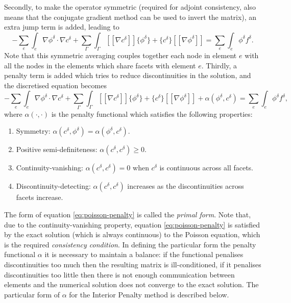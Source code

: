 Secondly, to make the operator symmetric (required for adjoint
consistency, also means that the conjugate gradient method can be used
to invert the matrix), an extra jump term is added, leading to
\begin{equation}
\label{eq:poisson-parts-facets-average-symmetric}
-\sum_e\int_e\nabla \phi^\delta\cdot\nabla c^\delta +
\sum_\Gamma\int_{\Gamma} [[\nabla c^\delta]]\{\phi^\delta\} +
\{c^\delta\}
[[\nabla\phi^\delta]] = \sum_e\int_e \phi^\delta f^{\delta}.
\end{equation}
Note that this symmetric averaging couples together each node in
element $e$ with all the nodes in the elements which share facets with
element $e$. Thirdly, a penalty term is added which tries to reduce
discontinuities in the solution, and the discretised equation becomes
\begin{equation}
\label{eq:poisson-penalty}
-\sum_e\int_e\nabla \phi^\delta\cdot\nabla c^\delta +
\sum_\Gamma\int_{\Gamma} [[\nabla c^\delta]]\{\phi^\delta\} +
\{c^\delta\}
[[\nabla\phi^\delta]] + \alpha(\phi^\delta,c^\delta)
= \sum_e\int_e \phi^\delta f^{\delta},
\end{equation}
where $\alpha(\cdot,\cdot)$ is the penalty functional which satisfies
the following properties:
\begin{enumerate}
\item Symmetry:
  $\alpha(c^\delta,\phi^\delta)=\alpha(\phi^\delta,c^\delta)$.
\item Positive semi-definiteness: $\alpha(c^\delta,c^\delta)\geq 0$.
\item Continuity-vanishing: $\alpha(c^\delta,c^\delta)=0$ when $c^\delta$ is continuous
 across all facets.
\item Discontinuity-detecting: $\alpha(c^\delta,c^\delta)$ increases
  as the discontinuities across facets increase.
\end{enumerate}
The form of equation \eqref{eq:poisson-penalty} is called the
\emph{primal form}.  Note that, due to the continuity-vanishing
property, equation \eqref{eq:poisson-penalty} is satisfied by the
exact solution (which is always continuous) to the Poisson equation,
which is the required \emph{consistency condition}.  In defining the
particular form the penalty functional $\alpha$ it is necessary to
maintain a balance: if the functional penalises discontinuities too
much then the resulting matrix is ill-conditioned, if it penalises
discontinuities too little then there is not enough communication
between elements and the numerical solution does not converge to the
exact solution. The particular form of $\alpha$ for the Interior
Penalty method is described below.


